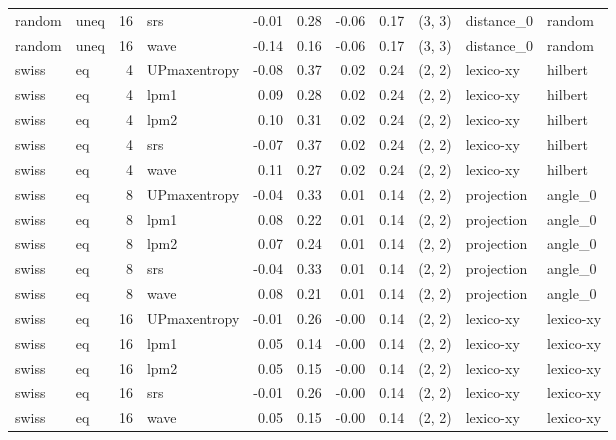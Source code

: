 \begin{tabular}{llrlrrrrlll}
random &  uneq & 16 &          srs & -0.01 &     0.28 &  -0.06 &       0.17 & (3, 3) &  distance_0 &     random \\
random &  uneq & 16 &         wave & -0.14 &     0.16 &  -0.06 &       0.17 & (3, 3) &  distance_0 &     random \\
 swiss &    eq &  4 & UPmaxentropy & -0.08 &     0.37 &   0.02 &       0.24 & (2, 2) &   lexico-xy &    hilbert \\
 swiss &    eq &  4 &         lpm1 &  0.09 &     0.28 &   0.02 &       0.24 & (2, 2) &   lexico-xy &    hilbert \\
 swiss &    eq &  4 &         lpm2 &  0.10 &     0.31 &   0.02 &       0.24 & (2, 2) &   lexico-xy &    hilbert \\
 swiss &    eq &  4 &          srs & -0.07 &     0.37 &   0.02 &       0.24 & (2, 2) &   lexico-xy &    hilbert \\
 swiss &    eq &  4 &         wave &  0.11 &     0.27 &   0.02 &       0.24 & (2, 2) &   lexico-xy &    hilbert \\
 swiss &    eq &  8 & UPmaxentropy & -0.04 &     0.33 &   0.01 &       0.14 & (2, 2) &  projection &    angle_0 \\
 swiss &    eq &  8 &         lpm1 &  0.08 &     0.22 &   0.01 &       0.14 & (2, 2) &  projection &    angle_0 \\
 swiss &    eq &  8 &         lpm2 &  0.07 &     0.24 &   0.01 &       0.14 & (2, 2) &  projection &    angle_0 \\
 swiss &    eq &  8 &          srs & -0.04 &     0.33 &   0.01 &       0.14 & (2, 2) &  projection &    angle_0 \\
 swiss &    eq &  8 &         wave &  0.08 &     0.21 &   0.01 &       0.14 & (2, 2) &  projection &    angle_0 \\
 swiss &    eq & 16 & UPmaxentropy & -0.01 &     0.26 &  -0.00 &       0.14 & (2, 2) &   lexico-xy &  lexico-xy \\
 swiss &    eq & 16 &         lpm1 &  0.05 &     0.14 &  -0.00 &       0.14 & (2, 2) &   lexico-xy &  lexico-xy \\
 swiss &    eq & 16 &         lpm2 &  0.05 &     0.15 &  -0.00 &       0.14 & (2, 2) &   lexico-xy &  lexico-xy \\
 swiss &    eq & 16 &          srs & -0.01 &     0.26 &  -0.00 &       0.14 & (2, 2) &   lexico-xy &  lexico-xy \\
 swiss &    eq & 16 &         wave &  0.05 &     0.15 &  -0.00 &       0.14 & (2, 2) &   lexico-xy &  lexico-xy \\

\end{tabular}
